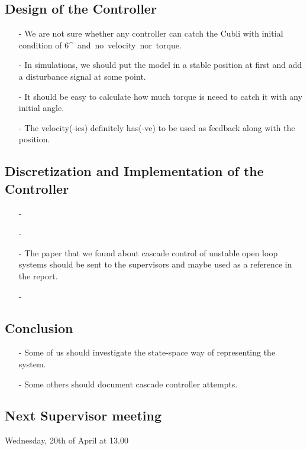 \subsection{Design of the Controller}
\begin{itemize}
  \item[-] We are not sure whether any controller can catch the Cubli with initial condition of 6\si{^{\circ}} and no velocity nor torque.
  \item[-] In simulations, we should put the model in a stable position at first and add a disturbance signal at some point.
  \item[-] It should be easy to calculate how much torque is neeed to catch it with any initial angle.
  \item[-] The velocity(-ies) definitely has(-ve) to be used as feedback along with the position. 
\end{itemize}

\subsection{Discretization and Implementation of the Controller}
\begin{itemize}
  \item[-] 
  \item[-] 
  \item[-] The paper that we found about cascade control of unstable open loop systems should be sent to the supervisors and maybe used as a reference in the report.
  \item[-] 
\end{itemize}

\subsection{Conclusion}
\begin{itemize}
  \item[-] Some of us should investigate the state-space way of representing the system.
  \item[-] Some others should document cascade controller attempts.
\end{itemize}

\subsection{Next Supervisor meeting}
Wednesday, 20th of April at 13.00

